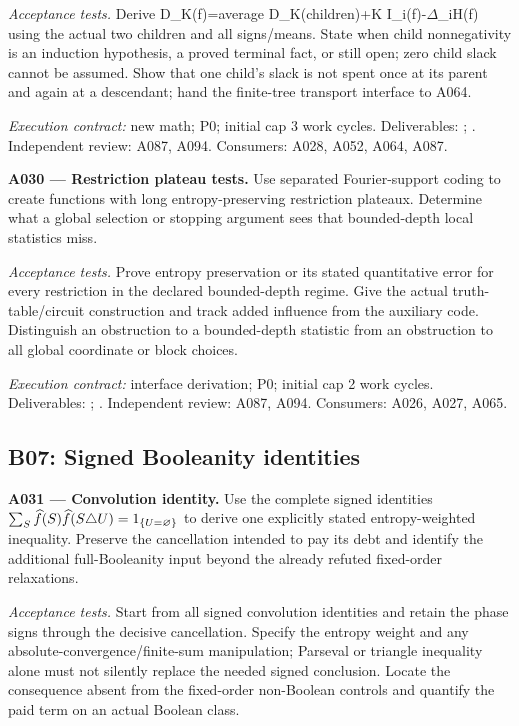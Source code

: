 \documentclass[11pt]{article}
\begin{document}
\emph{Acceptance tests.} Derive D\_K(f)=average D\_K(children)+K I\_i(f)-$\Delta$\_iH(f) using the actual two children and all signs/means. State when child nonnegativity is an induction hypothesis, a proved terminal fact, or still open; zero child slack cannot be assumed. Show that one child's slack is not spent once at its parent and again at a descendant; hand the finite-tree transport interface to A064.

{\small\emph{Execution contract:} new math; P0; initial cap 3 work cycles. Deliverables: ; . Independent review: A087, A094. Consumers: A028, A052, A064, A087.}

\textbf{A030 --- Restriction plateau tests.} Use separated Fourier-support coding to create functions with long entropy-preserving restriction plateaux. Determine what a global selection or stopping argument sees that bounded-depth local statistics miss.

\emph{Acceptance tests.} Prove entropy preservation or its stated quantitative error for every restriction in the declared bounded-depth regime. Give the actual truth-table/circuit construction and track added influence from the auxiliary code. Distinguish an obstruction to a bounded-depth statistic from an obstruction to all global coordinate or block choices.

{\small\emph{Execution contract:} interface derivation; P0; initial cap 2 work cycles. Deliverables: ; . Independent review: A087, A094. Consumers: A026, A027, A065.}

\subsection{B07: Signed Booleanity identities}

\textbf{A031 --- Convolution identity.} Use the complete signed identities $\sum_S\widehat{f}(S)\widehat{f}(S\triangle U)=1_{\{U=\varnothing\}}$ to derive one explicitly stated entropy-weighted inequality. Preserve the cancellation intended to pay its debt and identify the additional full-Booleanity input beyond the already refuted fixed-order relaxations.

\emph{Acceptance tests.} Start from all signed convolution identities and retain the phase signs through the decisive cancellation. Specify the entropy weight and any absolute-convergence/finite-sum manipulation; Parseval or triangle inequality alone must not silently replace the needed signed conclusion. Locate the consequence absent from the fixed-order non-Boolean controls and quantify the paid term on an actual Boolean class.
\end{document}
